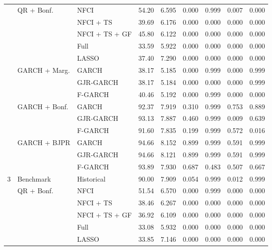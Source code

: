 \begin{tabular}{llp{10em}cccccc}
& \multirow{5}{*}{{QR + Bonf.}} &   NFCI & 54.20 & 6.595 & 0.000 & 0.999 & 0.007 & 0.000 \\ 
& &   NFCI + TS & 39.69 & 6.176 & 0.000 & 0.000 & 0.000 & 0.000 \\ 
& &   NFCI + TS + GF  & 45.80 & 6.122 & 0.000 & 0.000 & 0.000 & 0.000 \\ 
& &   Full & 33.59 & 5.922 & 0.000 & 0.000 & 0.000 & 0.000 \\ 
& &   LASSO & 37.40 & 7.290 & 0.000 & 0.000 & 0.000 & 0.000 \\  \cmidrule(lr){2-3} \cmidrule(lr){4-5} \cmidrule(lr){6-9}
& \multirow{3}{*}{{GARCH + Marg.}} &    GARCH  & 38.17 & 5.185 & 0.000 & 0.999 & 0.000 & 0.999 \\ 
& &   GJR-GARCH  & 38.17 & 5.184 & 0.000 & 0.000 & 0.000 & 0.999 \\ 
& &   F-GARCH  & 40.46 & 5.192 & 0.000 & 0.999 & 0.000 & 0.000 \\  \cmidrule(lr){2-3} \cmidrule(lr){4-5} \cmidrule(lr){6-9}
& \multirow{3}{*}{{GARCH + Bonf.}} &    GARCH  & 92.37 & 7.919 & 0.310 & 0.999 & 0.753 & 0.889 \\ 
& &   GJR-GARCH  & 93.13 & 7.887 & 0.460 & 0.999 & 0.009 & 0.639 \\ 
& &   F-GARCH  & 91.60 & 7.835 & 0.199 & 0.999 & 0.572 & 0.016 \\  \cmidrule(lr){2-3} \cmidrule(lr){4-5} \cmidrule(lr){6-9}
& \multirow{3}{*}{{GARCH + BJPR}} &    GARCH  & 94.66 & 8.152 & 0.899 & 0.999 & 0.591 & 0.999 \\ 
& &   GJR-GARCH  & 94.66 & 8.121 & 0.899 & 0.999 & 0.591 & 0.999 \\ 
& &   F-GARCH  & 93.89 & 7.930 & 0.687 & 0.483 & 0.507 & 0.667 \\ 
\toprule
\multirow{15}{*}{{3}} &
                      \multirow{1}{*}{{Benchmark}} & Historical & 90.00 & 7.909 & 0.054 & 0.999 & 0.012 & 0.999 \\  \cmidrule(lr){2-3} \cmidrule(lr){4-5} \cmidrule(lr){6-9}
& \multirow{5}{*}{{QR + Bonf.}} &   NFCI & 51.54 & 6.570 & 0.000 & 0.999 & 0.000 & 0.000 \\ 
& &   NFCI + TS & 38.46 & 6.267 & 0.000 & 0.000 & 0.000 & 0.000 \\ 
& &   NFCI + TS + GF  & 36.92 & 6.109 & 0.000 & 0.000 & 0.000 & 0.000 \\ 
& &   Full & 33.08 & 5.932 & 0.000 & 0.000 & 0.000 & 0.000 \\ 
& &   LASSO & 33.85 & 7.146 & 0.000 & 0.000 & 0.000 & 0.000 \\  \cmidrule(lr){2-3} \cmidrule(lr){4-5} \cmidrule(lr){6-9}

\end{tabular}
